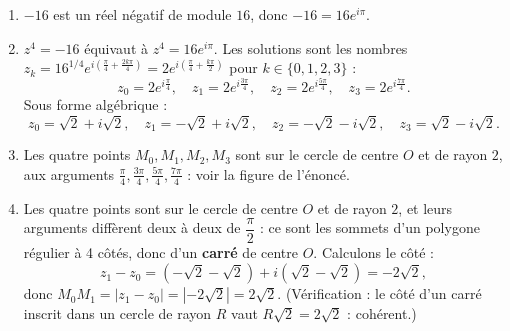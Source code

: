 \documentclass[11pt]{article}
\begin{document}
\begin{corrige}
\begin{enumerate}
\item $-16$ est un réel négatif de module $16$, donc $-16 = 16e^{i\pi}$.
\item $z^4 = -16$ équivaut à $z^4 = 16e^{i\pi}$. Les solutions sont les nombres $z_k = 16^{1/4}e^{i\left(\frac{\pi}{4} + \frac{2k\pi}{4}\right)} = 2e^{i\left(\frac{\pi}{4} + \frac{k\pi}{2}\right)}$ pour $k \in \{0, 1, 2, 3\}$ :
\[ z_0 = 2e^{i\frac{\pi}{4}}, \quad z_1 = 2e^{i\frac{3\pi}{4}}, \quad z_2 = 2e^{i\frac{5\pi}{4}}, \quad z_3 = 2e^{i\frac{7\pi}{4}}. \]
Sous forme algébrique :
\[ z_0 = \sqrt{2} + i\sqrt{2}, \quad z_1 = -\sqrt{2} + i\sqrt{2}, \quad z_2 = -\sqrt{2} - i\sqrt{2}, \quad z_3 = \sqrt{2} - i\sqrt{2}. \]
\item Les quatre points $M_0, M_1, M_2, M_3$ sont sur le cercle de centre $O$ et de rayon $2$, aux arguments $\frac{\pi}{4}, \frac{3\pi}{4}, \frac{5\pi}{4}, \frac{7\pi}{4}$ : voir la figure de l'énoncé.
\item Les quatre points sont sur le cercle de centre $O$ et de rayon $2$, et leurs arguments diffèrent deux à deux de $\dfrac{\pi}{2}$ : ce sont les sommets d'un polygone régulier à 4 côtés, donc d'un \textbf{carré} de centre $O$. Calculons le côté :
\[ z_1 - z_0 = \left(-\sqrt{2} - \sqrt{2}\right) + i\left(\sqrt{2} - \sqrt{2}\right) = -2\sqrt{2}, \]
donc $M_0M_1 = |z_1 - z_0| = |-2\sqrt{2}| = 2\sqrt{2}$. (Vérification : le côté d'un carré inscrit dans un cercle de rayon $R$ vaut $R\sqrt{2} = 2\sqrt{2}$ : cohérent.)
\end{enumerate}
\end{corrige}
\end{document}
